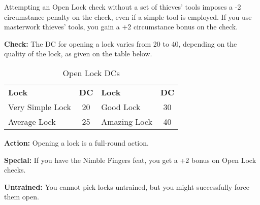 
Attempting an Open Lock check without a set of thieves' tools imposes a -2 circumstance penalty on the check, even if a simple tool is employed. If you use masterwork thieves' tools, you gain a +2 circumstance bonus on the check.

\textbf{Check:} The DC for opening a lock varies from 20 to 40, depending on the quality of the lock, as given on the table below.

\begin{table}[htb]
\caption{Open Lock DCs}
\centering
\begin{tabular}{l c l c}
\textbf{Lock} & \textbf{DC} & \textbf{Lock} & \textbf{DC}\\
Very Simple Lock & 20 & Good Lock & 30\\
Average Lock & 25 & Amazing Lock & 40\\
\end{tabular}
\end{table}

\textbf{Action:} Opening a lock is a full-round action.

\textbf{Special:} If you have the Nimble Fingers feat, you get a +2 bonus on Open Lock checks.

\textbf{Untrained:} You cannot pick locks untrained, but you might successfully force them open.
